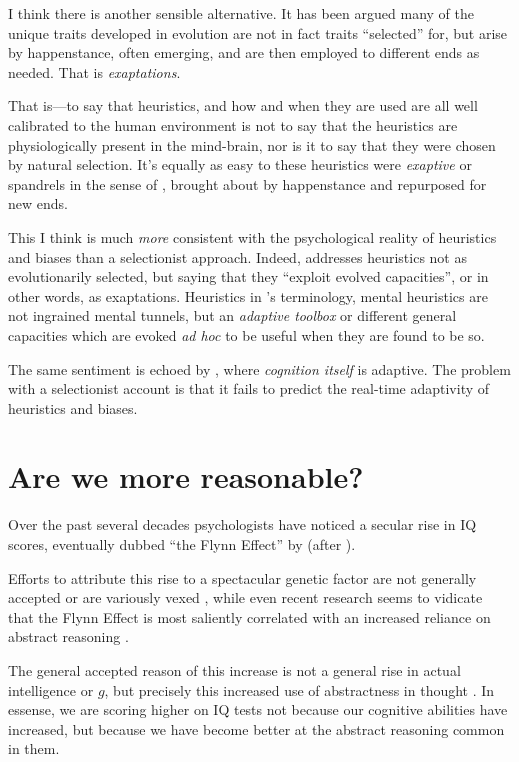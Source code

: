 \documentclass{article}
\begin{document}
I think there is another sensible alternative.
It has been argued \parencite{massimo89,gould91} many of the unique traits developed in evolution are not in fact traits ``selected'' for, but arise by happenstance, often emerging, and are then employed to different ends as needed.
That is \textit{exaptations}.

That is---to say that heuristics, and how and when they are used are all well calibrated to the human environment is not to say that the heuristics are physiologically present in the mind-brain, nor is it to say that they were chosen by natural selection.
It's equally as easy to these heuristics were \emph{exaptive} \parencite{buss98} or spandrels in the sense of \textcite{gould79}, brought about by happenstance and repurposed for new ends.

This I think is much \emph{more} consistent with the psychological reality of heuristics and biases than a selectionist approach.
Indeed, \textcite{gigerenzer08} addresses heuristics not as evolutionarily selected, but saying that they ``exploit evolved capacities'', or in other words, as exaptations.
Heuristics in \textcite{gigerenzer08}'s terminology, mental heuristics are not ingrained mental tunnels, but an \emph{adaptive toolbox} or different general capacities which are evoked \emph{ad hoc} to be useful when they are found to be so.

The same sentiment is echoed by \textcite{anderson90}, where \emph{cognition itself} is adaptive.
The problem with a selectionist account is that it fails to predict the real-time adaptivity of heuristics and biases.

\section{Are we more reasonable?}

Over the past several decades psychologists have noticed a secular rise in IQ scores, eventually dubbed ``the Flynn Effect'' by \textcite{herrnstein94} (after \textcite{flynn87}).

Efforts to attribute this rise to a spectacular genetic factor are not generally accepted or are variously vexed \parencite{woodley11}, while even recent research seems to vidicate that the Flynn Effect is most saliently correlated with an increased reliance on abstract reasoning \parencite{must16}.

The general accepted reason of this increase is not a general rise in actual intelligence or $g$, but precisely this increased use of abstractness in thought \parencite{flynn07}.
In essense, we are scoring higher on IQ tests not because our cognitive abilities have increased, but because we have become better at the abstract reasoning common in them.



\printbibliography
\end{document}
